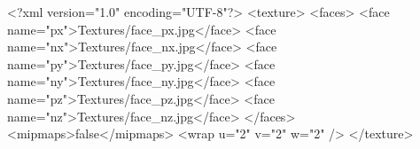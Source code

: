 <?xml version="1.0" encoding="UTF-8"?>
<texture>
    <faces>
        <face name="px">Textures/face_px.jpg</face>
        <face name="nx">Textures/face_nx.jpg</face>
        <face name="py">Textures/face_py.jpg</face>
        <face name="ny">Textures/face_ny.jpg</face>
        <face name="pz">Textures/face_pz.jpg</face>
        <face name="nz">Textures/face_nz.jpg</face>
    </faces>
    <mipmaps>false</mipmaps>
    <wrap u="2" v="2" w="2" />
</texture>